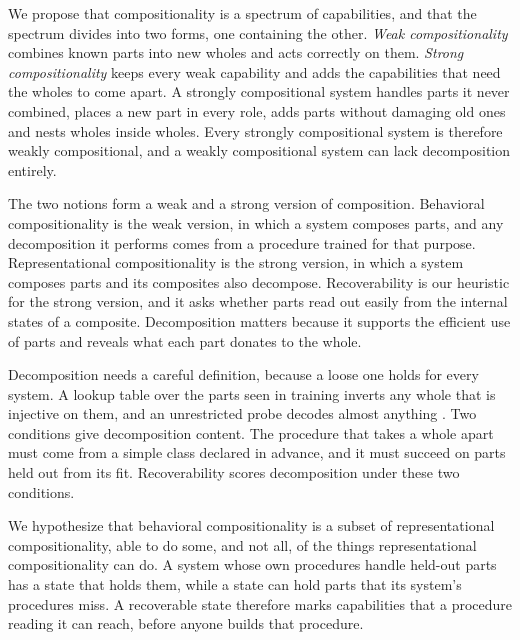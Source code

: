 We propose that compositionality is a spectrum of capabilities, and that the spectrum divides into two forms, one containing the other. \emph{Weak compositionality} combines known parts into new wholes and acts correctly on them. \emph{Strong compositionality} keeps every weak capability and adds the capabilities that need the wholes to come apart. A strongly compositional system handles parts it never combined, places a new part in every role, adds parts without damaging old ones and nests wholes inside wholes. Every strongly compositional system is therefore weakly compositional, and a weakly compositional system can lack decomposition entirely.

The two notions form a weak and a strong version of composition. Behavioral compositionality is the weak version, in which a system composes parts, and any decomposition it performs comes from a procedure trained for that purpose. Representational compositionality is the strong version, in which a system composes parts and its composites also decompose. Recoverability is our heuristic for the strong version, and it asks whether parts read out easily from the internal states of a composite. Decomposition matters because it supports the efficient use of parts and reveals what each part donates to the whole.

Decomposition needs a careful definition, because a loose one holds for every system. A lookup table over the parts seen in training inverts any whole that is injective on them, and an unrestricted probe decodes almost anything \citep{hewitt2019}. Two conditions give decomposition content. The procedure that takes a whole apart must come from a simple class declared in advance, and it must succeed on parts held out from its fit. Recoverability scores decomposition under these two conditions.

We hypothesize that behavioral compositionality is a subset of representational compositionality, able to do some, and not all, of the things representational compositionality can do. A system whose own procedures handle held-out parts has a state that holds them, while a state can hold parts that its system's procedures miss. A recoverable state therefore marks capabilities that a procedure reading it can reach, before anyone builds that procedure.

